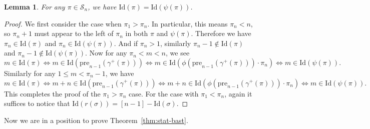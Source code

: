 \documentclass[12pt]{amsart}
\numberwithin{equation}{section}
\theoremstyle{plain}
\newtheorem{lemma}[theorem]{Lemma}
\theoremstyle{definition}
\def\Id{\mathrm{Id}}
\def\pre{\mathrm{pre}}
\def\SS{\mathcal{S}}
\begin{document}
\begin{lemma}\label{psi:Id}
For any $\pi\in\SS_n$, we have $\Id(\pi)=\Id(\psi(\pi))$.
\end{lemma}
\begin{proof}
We first consider the case when $\pi_1>\pi_n$. In particular, this means $\pi_n<n$, so $\pi_{n}+1$ must appear to the left of $\pi_n$ in both $\pi$ and $\psi(\pi)$. Therefore we have $\pi_n\in\Id(\pi)$ and $\pi_n\in\Id(\psi(\pi))$. And if $\pi_n>1$, similarly $\pi_n-1\not\in\Id(\pi)$ and $\pi_n-1\not\in\Id(\psi(\pi))$. Now for any $\pi_n<m<n$, we see
$$m\in\Id(\pi) \Leftrightarrow m\in\Id(\pre_{n-1}(\gamma^+(\pi))) \Leftrightarrow m\in\Id(\phi(\pre_{n-1}(\gamma^+(\pi)))\cdot\pi_n)\Leftrightarrow m\in\Id(\psi(\pi)).$$
Similarly for any $1\le m<\pi_n-1$, we have
$$m\in\Id(\pi)\Leftrightarrow m+n\in\Id(\pre_{n-1}(\gamma^+(\pi)))\Leftrightarrow m+n\in\Id(\phi(\pre_{n-1}(\gamma^+(\pi)))\cdot\pi_n)\Leftrightarrow m\in\Id(\psi(\pi)).$$
This completes the proof of the $\pi_1>\pi_n$ case. For the case with $\pi_1<\pi_n$, again it suffices to notice that $\Id(r(\sigma))=[n-1]-\Id(\sigma)$.
\end{proof}

Now we are in a position to prove Theorem~\ref{thm:stat-bast}.
\end{document}
